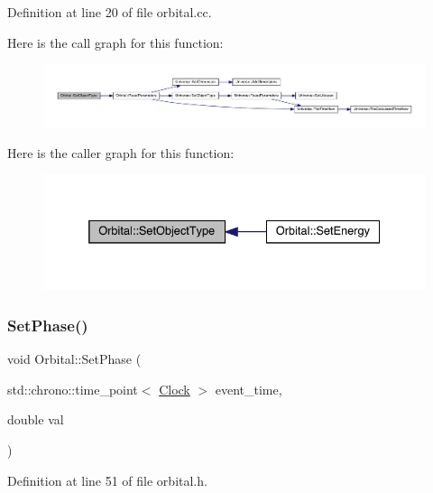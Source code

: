 Definition at line 20 of file orbital.\+cc.

Here is the call graph for this function\+:
\nopagebreak
\begin{figure}[H]
\begin{center}
\leavevmode
\includegraphics[width=350pt]{class_orbital_afd0dfd382d4bf7d9fbace315bd37fa85_cgraph}
\end{center}
\end{figure}
Here is the caller graph for this function\+:
\nopagebreak
\begin{figure}[H]
\begin{center}
\leavevmode
\includegraphics[width=332pt]{class_orbital_afd0dfd382d4bf7d9fbace315bd37fa85_icgraph}
\end{center}
\end{figure}
\mbox{\label{class_orbital_ac1c58fcb56e4d5c19c4ab39cc09c88ad}} 
\subsubsection{\texorpdfstring{Set\+Phase()}{SetPhase()}}
{\footnotesize\ttfamily void Orbital\+::\+Set\+Phase (\begin{DoxyParamCaption}\item[{std\+::chrono\+::time\+\_\+point$<$ \hyperlink{universe_8h_a0ef8d951d1ca5ab3cfaf7ab4c7a6fd80}{Clock} $>$}]{event\+\_\+time,  }\item[{double}]{val }\end{DoxyParamCaption})\hspace{0.3cm}{\ttfamily [inline]}}



Definition at line 51 of file orbital.\+h.

\mbox{\label{class_orbital_a16ff46f7e720f2f7aed332585310a9b8}} 

